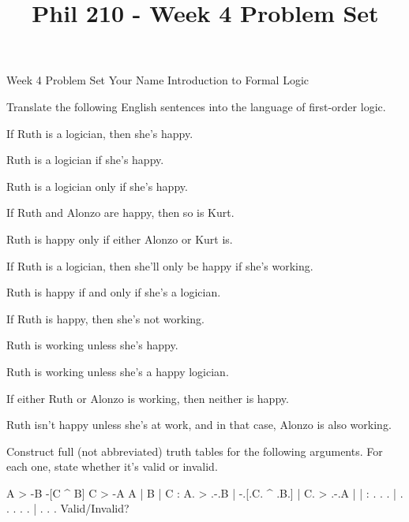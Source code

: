 
\title{Phil 210 - Week 4 Problem Set}

\heading
Week 4 Problem Set
Your Name
Introduction to Formal Logic
\endheading

Translate the following English sentences into the language of first-order logic.

\problems
{}
If Ruth is a logician, then she's happy.
        \answer
        $ $
        \endanswer

Ruth is a logician if she's happy.
        \answer
        $ $
        \endanswer

Ruth is a logician only if she's happy.
        \answer
        $ $
        \endanswer

If Ruth and Alonzo are happy, then so is Kurt.
        \answer
        $ $
        \endanswer

Ruth is happy only if either Alonzo or Kurt is.
        \answer
        $ $
        \endanswer

If Ruth is a logician, then she'll only be happy if she's working.
        \answer
        $ $
        \endanswer

Ruth is happy if and only if she's a logician.
        \answer
        $ $
        \endanswer

If Ruth is happy, then she's not working.
        \answer
        $ $
        \endanswer

Ruth is working unless she's happy.
        \answer
        $ $
        \endanswer

Ruth is working unless she's a happy logician.
        \answer
        $ $
        \endanswer

If either Ruth or Alonzo is working, then neither is happy.
        \answer
        $ $
        \endanswer

Ruth isn't happy unless she's at work, and in that case, Alonzo is also working.
        \answer
        $ $
        \endanswer

\endproblems

Construct full (not abbreviated) truth tables for the following arguments. For each one, state whether it's valid or invalid.

\problems
{}
\argument
 A > -B
 -[C ^ B]
\argumentline
 C > -A
\endargument
        \answer
        \truthtable
         A | B | C : A. > .-.B | -.[.C. ^ .B.] | C. > .-.A
        \truthtableline
           |   |   :  .   . .  |  . . .   . .  |  .   . . 
        \endtruthtable
        Valid/Invalid?
        \endanswer


